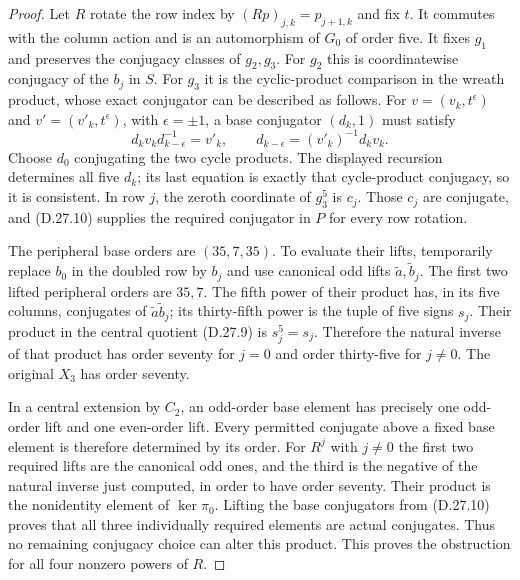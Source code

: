 \begin{proof}
Let $R$ rotate the row index by
$(Rp)_{j,k}=p_{j+1,k}$ and fix $t$.  It commutes with the
column action and is an automorphism of $G_0$ of order five.
It fixes $g_1$ and preserves the conjugacy classes of $g_2,g_3$.
For $g_2$ this is coordinatewise conjugacy of the $b_j$ in $S$.
For $g_3$ it is the cyclic-product comparison in the wreath
product, whose exact conjugator can be described as follows.
For $v=(v_k,t^\epsilon)$ and $v'=(v'_k,t^\epsilon)$, with
$\epsilon=\pm1$, a base conjugator $(d_k,1)$ must satisfy
\[
 d_kv_kd_{k-\epsilon}^{-1}=v'_k,
 \qquad
 d_{k-\epsilon}=(v'_k)^{-1}d_kv_k.
 \tag{D.27.10}
\]
Choose $d_0$ conjugating the two cycle products.  The displayed
recursion determines all five $d_k$; its last equation is
exactly that cycle-product conjugacy, so it is consistent.
In row $j$, the zeroth coordinate of $g_3^5$ is $c_j$.
Those $c_j$ are conjugate, and \textup{(D.27.10)} supplies
the required conjugator in $P$ for every row rotation.

The peripheral base orders are $(35,7,35)$.  To evaluate their
lifts, temporarily replace $b_0$ in the doubled row by $b_j$
and use canonical odd lifts $\widetilde a,\widetilde b_j$.
The first two lifted peripheral orders are $35,7$.
The fifth power of their product has, in its five columns,
conjugates of $\widetilde a\widetilde b_j$; its
thirty-fifth power is the tuple of five signs $s_j$.
Their product in the central quotient \textup{(D.27.9)}
is $s_j^5=s_j$.  Therefore the natural inverse of that
product has order seventy for $j=0$ and order thirty-five
for $j\ne0$.  The original $X_3$ has order seventy.

In a central extension by $C_2$, an odd-order base element
has precisely one odd-order lift and one even-order lift.
Every permitted conjugate above a fixed base element is
therefore determined by its order.  For $R^j$ with $j\ne0$
the first two required lifts are the canonical odd ones, and
the third is the negative of the natural inverse just
computed, in order to have order seventy.  Their product is
the nonidentity element of $\ker\pi_0$.
Lifting the base conjugators from \textup{(D.27.10)} proves
that all three individually required elements are actual
conjugates.  Thus no remaining conjugacy choice can alter
this product.  This proves the obstruction for all four
nonzero powers of $R$.


\end{proof}
